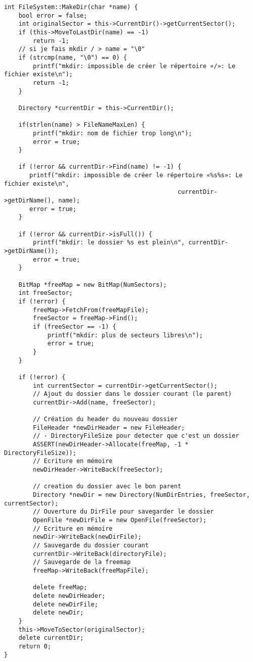 \documentclass[a4paper,10pt]{article}
\begin{document}
\begin{lstlisting}
int FileSystem::MakeDir(char *name) {
    bool error = false;
    int originalSector = this->CurrentDir()->getCurrentSector();
    if (this->MoveToLastDir(name) == -1)
        return -1;
    // si je fais mkdir / > name = "\0"
    if (strcmp(name, "\0") == 0) {
        printf("mkdir: impossible de créer le répertoire «/»: Le fichier existe\n");
        return -1;
    }

    Directory *currentDir = this->CurrentDir();

    if(strlen(name) > FileNameMaxLen) {
        printf("mkdir: nom de fichier trop long\n");
        error = true;
    }

    if (!error && currentDir->Find(name) != -1) {
       printf("mkdir: impossible de créer le répertoire «%s%s»: Le fichier existe\n",
                                                currentDir->getDirName(), name);
       error = true;
    }

    if (!error && currentDir->isFull()) {
        printf("mkdir: le dossier %s est plein\n", currentDir->getDirName());
        error = true;
    }

    BitMap *freeMap = new BitMap(NumSectors);
    int freeSector;
    if (!error) {
        freeMap->FetchFrom(freeMapFile);
        freeSector = freeMap->Find();
        if (freeSector == -1) {
            printf("mkdir: plus de secteurs libres\n");
            error = true;
        }
    }

    if (!error) {
        int currentSector = currentDir->getCurrentSector();
        // Ajout du dossier dans le dossier courant (le parent)
        currentDir->Add(name, freeSector);

        // Création du header du nouveau dossier
        FileHeader *newDirHeader = new FileHeader;
        // - DirectoryFileSize pour detecter que c'est un dossier
        ASSERT(newDirHeader->Allocate(freeMap, -1 * DirectoryFileSize));
        // Ecriture en mémoire
        newDirHeader->WriteBack(freeSector);

        // creation du dossier avec le bon parent
        Directory *newDir = new Directory(NumDirEntries, freeSector, currentSector);
        // Ouverture du DirFile pour savegarder le dossier
        OpenFile *newDirFile = new OpenFile(freeSector);
        // Ecriture en mémoire
        newDir->WriteBack(newDirFile);
        // Sauvegarde du dossier courant
        currentDir->WriteBack(directoryFile);
        // Sauvegarde de la freemap
        freeMap->WriteBack(freeMapFile);

        delete freeMap;
        delete newDirHeader;
        delete newDirFile;
        delete newDir;
    }
    this->MoveToSector(originalSector);
    delete currentDir;
    return 0;
}


\end{lstlisting}
\end{document}
